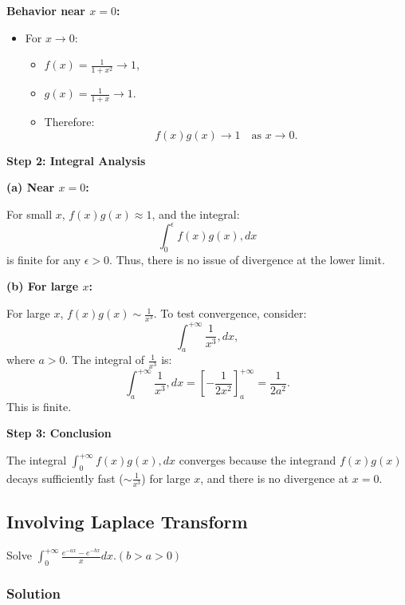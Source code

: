 \documentclass[a4paper,12pt]{book}
\begin{document}
\textbf{Behavior near \( x = 0 \):}
\begin{itemize}
\item 
For \( x \to 0 \):
\begin{itemize}
\item 
\( f(x) = \frac{1}{1+x^2} \to 1 \),

\item 
\( g(x) = \frac{1}{1+x} \to 1 \).

\item 
Therefore:
\[
f(x)g(x) \to 1 \quad \text{as } x \to 0.
\]

\end{itemize}

\end{itemize}

\hrulefill

\textbf{Step 2: Integral Analysis}

\textbf{(a) Near \( x = 0 \):}

For small \( x \), \( f(x)g(x) \approx 1 \), and the integral:
\[
\int_0^\epsilon f(x)g(x) , dx
\]
is finite for any \( \epsilon > 0 \). Thus, there is no issue of divergence at the lower limit.

\textbf{(b) For large \( x \):}

For large \( x \), \( f(x)g(x) \sim \frac{1}{x^3} \). To test convergence, consider:
\[
\int_a^{+\infty} \frac{1}{x^3} , dx,
\]
where \( a > 0 \). The integral of \( \frac{1}{x^3} \) is:
\[
\int_a^{+\infty} \frac{1}{x^3} , dx = \left[ -\frac{1}{2x^2} \right]_a^{+\infty} = \frac{1}{2a^2}.
\]
This is finite.

\hrulefill

\textbf{Step 3: Conclusion}

The integral \( \int_0^{+\infty} f(x)g(x) , dx \) converges because the integrand \( f(x)g(x) \) decays sufficiently fast (\( \sim \frac{1}{x^3} \)) for large \( x \), and there is no divergence at \( x = 0 \).


\subsection{Involving Laplace Transform}

Solve \(\int_0^{+\infty} \frac{e^{-ax}-e^{-bx}}{x} dx. (b>a>0)\)

\subsubsection{Solution}
\end{document}
